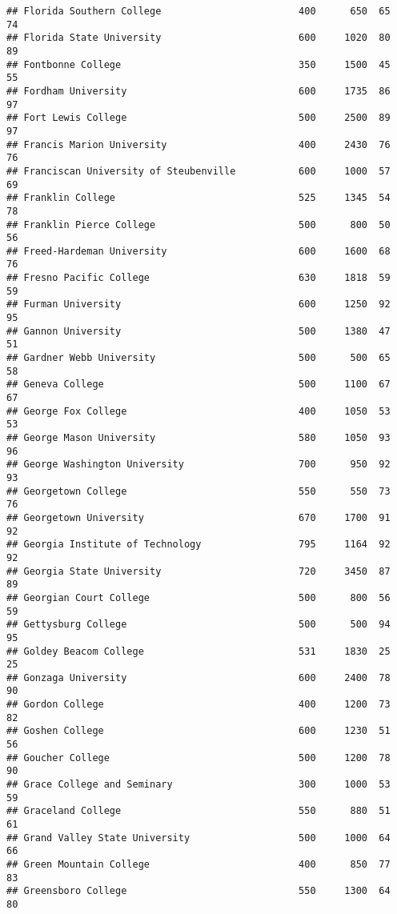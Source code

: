 \documentclass[
]{article}
\begin{document}
\begin{verbatim}
## Florida Southern College                        400      650  65       74
## Florida State University                        600     1020  80       89
## Fontbonne College                               350     1500  45       55
## Fordham University                              600     1735  86       97
## Fort Lewis College                              500     2500  89       97
## Francis Marion University                       400     2430  76       76
## Franciscan University of Steubenville           600     1000  57       69
## Franklin College                                525     1345  54       78
## Franklin Pierce College                         500      800  50       56
## Freed-Hardeman University                       600     1600  68       76
## Fresno Pacific College                          630     1818  59       59
## Furman University                               600     1250  92       95
## Gannon University                               500     1380  47       51
## Gardner Webb University                         500      500  65       58
## Geneva College                                  500     1100  67       67
## George Fox College                              400     1050  53       53
## George Mason University                         580     1050  93       96
## George Washington University                    700      950  92       93
## Georgetown College                              550      550  73       76
## Georgetown University                           670     1700  91       92
## Georgia Institute of Technology                 795     1164  92       92
## Georgia State University                        720     3450  87       89
## Georgian Court College                          500      800  56       59
## Gettysburg College                              500      500  94       95
## Goldey Beacom College                           531     1830  25       25
## Gonzaga University                              600     2400  78       90
## Gordon College                                  400     1200  73       82
## Goshen College                                  600     1230  51       56
## Goucher College                                 500     1200  78       90
## Grace College and Seminary                      300     1000  53       59
## Graceland College                               550      880  51       61
## Grand Valley State University                   500     1000  64       66
## Green Mountain College                          400      850  77       83
## Greensboro College                              550     1300  64       80

\end{verbatim}
\end{document}
